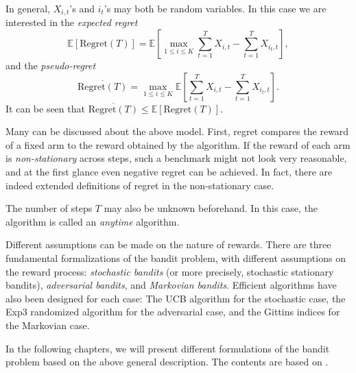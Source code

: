 \documentclass[openany]{book}
\theoremstyle{definition}
\theoremstyle{remark}
\begin{document}
In general, $X_{i,t}$'s and $i_t$'s may both be random variables. In this case we are interested in the \emph{expected regret}
\begin{equation}\label{expectedRegret}
    \mathbb{E}[\mathrm{Regret}(T)]=\mathbb{E}\left[\max_{1\le i\le K}\sum_{t=1}^{T}X_{i,t}-\sum_{t=1}^{T}X_{i_t,t}\right],
\end{equation}
and the \emph{pseudo-regret}
\begin{equation}\label{pseudoRegret}
    \overline{\mathrm{Regret}(T)}=\max_{1\le i\le K}\mathbb{E}\left[\sum_{t=1}^{T}X_{i,t}-\sum_{t=1}^{T}X_{i_t,t}\right].
\end{equation}
It can be seen that $\overline{\mathrm{Regret}(T)}\le \mathbb{E}[\mathrm{Regret}(T)]$.

Many can be discussed about the above model. First, regret compares the reward of a fixed arm to the reward obtained by the algorithm. If the reward of each arm is \emph{non-stationary} across steps, such a benchmark might not look very reasonable, and at the first glance even negative regret can be achieved. In fact, there are indeed extended definitions of regret in the non-stationary case.

The number of steps $T$ may also be unknown beforehand. In this case, the algorithm is called an \emph{anytime} algorithm.

Different assumptions can be made on the nature of rewards. There are three fundamental formalizations of the bandit problem, with different assumptions on the reward process: \emph{stochastic bandits} (or more precisely, stochastic stationary bandits), \emph{adversarial bandits}, and \emph{Markovian bandits}. Efficient algorithms have also been designed for each case: The UCB algorithm for the stochastic case, the Exp3 randomized algorithm for the adversarial case, and the Gittins indices for the Markovian case.

In the following chapters, we will present different formulations of the bandit problem based on the above general description. The contents are based on \cite{BC12}.
\end{document}
